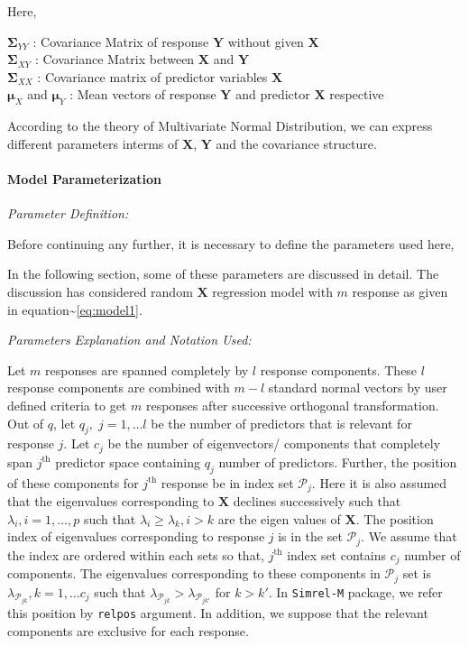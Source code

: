 \documentclass[12pt,A4paper,authoryear]{elsarticle} %
\begin{document}
Here,

\(\boldsymbol{\Sigma}_{YY}\) : Covariance Matrix of response
\(\mathbf{Y}\) without given \(\mathbf{X}\)\\
\(\boldsymbol{\Sigma}_{XY}\) : Covariance Matrix between \(\mathbf{X}\)
and \(\mathbf{Y}\)\\
\(\boldsymbol{\Sigma}_{XX}\) : Covariance matrix of predictor variables
\(\mathbf{X}\)\\
\(\boldsymbol{\mu}_X\) and \(\boldsymbol{\mu}_Y\) : Mean vectors of
response \(\mathbf{Y}\) and predictor \(\mathbf{X}\) respective

According to the theory of Multivariate Normal Distribution, we can
express different parameters interms of \(\mathbf{X}\), \(\mathbf{Y}\)
and the covariance structure.

\paragraph{Model Parameterization}\label{model-parameterization}

\emph{Parameter Definition:}

Before continuing any further, it is necessary to define the parameters
used here,

In the following section, some of these parameters are discussed in
detail. The discussion has considered random \(\mathbf{X}\) regression
model with \(m\) response as given in
equation\textasciitilde{}\eqref{eq:model1}.

\emph{Parameters Explanation and Notation Used:}

Let \(m\) responses are spanned completely by \(l\) response components.
These \(l\) response components are combined with \(m-l\) standard
normal vectors by user defined criteria to get \(m\) responses after
successive orthogonal transformation. Out of \(q\), let
\(q_j,\; j = 1, \ldots l\) be the number of predictors that is relevant
for response \(j\). Let \(c_j\) be the number of eigenvectors/
components that completely span \(j^\text{th}\) predictor space
containing \(q_j\) number of predictors. Further, the position of these
components for \(j^\text{th}\) response be in index set
\(\mathcal{P}_j\). Here it is also assumed that the eigenvalues
corresponding to \(\mathbf{X}\) declines successively such that
\(\lambda_i, i = 1, \ldots, p\) such that
\(\lambda_i \ge \lambda_k, i > k\) are the eigen values of
\(\mathbf{X}\). The position index of eigenvalues corresponding to
response \(j\) is in the set \(\mathcal{P}_j\). We assume that the index
are ordered within each sets so that, \(j^\text{th}\) index set contains
\(c_j\) number of components. The eigenvalues corresponding to these
components in \(\mathcal{P}_j\) set is
\(\lambda_{\mathcal{P}_{jk}}, k = 1, \ldots c_j\) such that
\(\lambda_{\mathcal{P}_{jk}} > \lambda_{\mathcal{P}_{jk'}}\) for
\(k > k'\). In \texttt{Simrel-M} package, we refer this position by
\texttt{relpos} argument. In addition, we suppose that the relevant
components are exclusive for each response.
\end{document}
